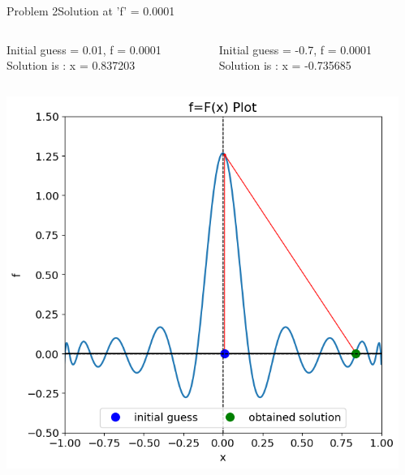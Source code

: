 \documentclass{beamer}
\begin{document}
\begin{frame}{Problem 2}{Solution at 'f' = 0.0001}
    \vspace{-2em}
    \begin{columns}
        \begin{block}{\footnotesize Initial guess = 0.01, f = 0.0001}
            \footnotesize
            Solution is : x = 0.837203
        \end{block}
        \begin{block}{\footnotesize Initial guess = -0.7, f = 0.0001}
            \footnotesize
            Solution is : x = -0.735685
        \end{block}
    \end{columns}
    \vspace{-0.3em}
    \begin{columns}
        \begin{block}{}
            \includegraphics[width=\textwidth]{Figures/prob2_sol11.png}
        \end{block}
        \begin{block}{}

\end{block}
\end{columns}
\end{frame}
\end{document}

